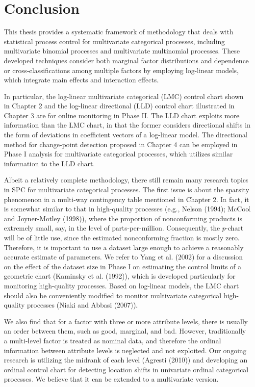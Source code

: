 \chapter{Conclusion}\label{chp5}

This thesis provides a systematic framework of methodology that deals with
statistical process control for multivariate categorical processes, including
multivariate binomial processes and multivariate multinomial processes. These
developed techniques consider both marginal factor distributions and dependence or
cross-classifications among multiple factors by employing log-linear models, which
integrate main effects and interaction effects.

In particular, the log-linear multivariate categorical (LMC) control chart shown in
Chapter 2 and the log-linear directional (LLD) control chart illustrated in Chapter
3 are for online monitoring in Phase II. The LLD chart exploits more information
than the LMC chart, in that the former considers directional shifts in the form of
deviations in coefficient vectors of a log-linear model. The directional method for
change-point detection proposed in Chapter 4 can be employed in Phase I analysis for
multivariate categorical processes, which utilizes similar information to the LLD
chart.

Albeit a relatively complete methodology, there still remain many research topics in
SPC for multivariate categorical processes. The first issue is about the sparsity
phenomenon in a multi-way contingency table mentioned in Chapter 2. In fact, it is
somewhat similar to that in high-quality processes (e.g., Nelson (1994); McCool and
Joyner-Motley (1998)), where the proportion of nonconforming products is extremely
small, say, in the level of parts-per-million. Consequently, the $p$-chart will be
of little use, since the estimated nonconforming fraction is mostly zero. Therefore,
it is important to use a dataset large enough to achieve a reasonably accurate
estimate of parameters. We refer to Yang et al. (2002) for a discussion on the
effect of the dataset size in Phase I on estimating the control limits of a
geometric chart (Kaminsky et al. (1992)), which is developed particularly for
monitoring high-quality processes. Based on log-linear models, the LMC chart should
also be conveniently modified to monitor multivariate categorical high-quality
processes (Niaki and Abbasi (2007)).

We also find that for a factor with three or more attribute levels, there is usually
an order between them, such as good, marginal, and bad. However, traditionally a
multi-level factor is treated as nominal data, and therefore the ordinal information
between attribute levels is neglected and not exploited. Our ongoing research is
utilizing the midrank of each level (Agresti (2010)) and developing an ordinal
control chart for detecting location shifts in univariate ordinal categorical
processes. We believe that it can be extended to a multivariate version.

